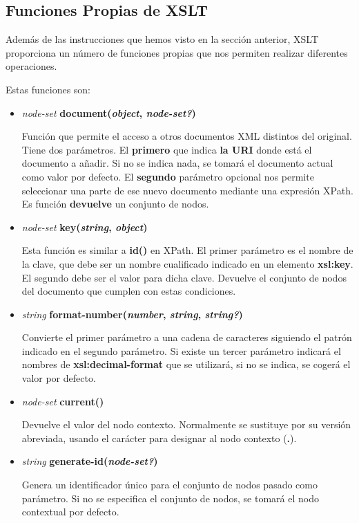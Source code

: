 \subsection{Funciones Propias de XSLT}
Además de las instrucciones que hemos visto en la sección anterior, XSLT proporciona un número de funciones propias que nos permiten realizar diferentes operaciones.

Estas funciones son:

\begin{itemize}
    \item \textit{node-set} \textbf{document(\textit{object}, \textit{node-set?})}

    Función que permite el acceso a otros documentos XML distintos del original. Tiene dos parámetros. El \textbf{primero} que indica \textbf{la URI} donde está el documento a añadir. Si no se indica nada, se tomará el documento actual como valor por defecto. El \textbf{segundo} parámetro opcional nos permite seleccionar una parte de ese nuevo documento mediante una expresión XPath. Es función \textbf{devuelve} un conjunto de nodos.

    \item \textit{node-set} \textbf{key(\textit{string}, \textit{object})}

    Esta función es similar a \textbf{id()} en XPath. El primer parámetro es el nombre de la clave, que debe ser un nombre cualificado indicado	en un elemento \textbf{xsl:key}. El segundo debe ser el valor para dicha clave. Devuelve el conjunto de nodos del documento que cumplen con estas condiciones.

    \item \textit{string} \textbf{ format-number(\textit{number}, \textit{string}, \textit{string?})}

    Convierte el primer parámetro a una cadena de caracteres siguiendo el patrón indicado en el segundo parámetro. Si existe un tercer parámetro indicará el nombres de \textbf{xsl:decimal-format} que se utilizará, si no se indica, se cogerá el valor por defecto.

    \item \textit{node-set} \textbf{current()}

    Devuelve el valor del nodo contexto. Normalmente se sustituye por su versión abreviada, usando el carácter para designar al nodo contexto (\textbf{.}).

    \item \textit{string} \textbf{generate-id(\textit{node-set?})}

    Genera un identificador único para el conjunto de nodos pasado como parámetro. Si no se especifica el conjunto de nodos, se tomará el nodo contextual por defecto.
\end{itemize}

